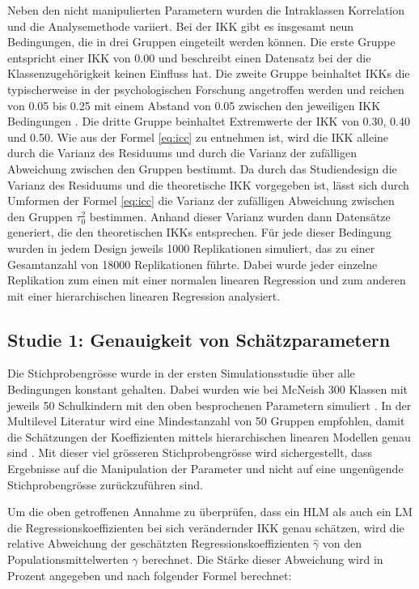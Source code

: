 \documentclass[12pt]{article}\usepackage[]{graphicx}\usepackage[]{color}
\begin{document}
Neben den nicht manipulierten Parametern wurden die Intraklassen Korrelation und die Analysemethode variiert. Bei der IKK gibt es insgesamt neun Bedingungen, die in drei Gruppen eingeteilt werden können. Die erste Gruppe entspricht einer IKK von 0.00 und beschreibt einen Datensatz bei der die Klassenzugehörigkeit keinen Einfluss hat. Die zweite Gruppe beinhaltet IKKs die typischerweise in der psychologischen Forschung angetroffen werden und reichen von 0.05 bis 0.25 mit einem Abstand von 0.05 zwischen den jeweiligen IKK Bedingungen \citep{hedges&hedberg:2007, SnijdersTomA.B2012Ma:a}. Die dritte Gruppe beinhaltet Extremwerte der IKK von 0.30, 0.40 und 0.50. Wie aus der Formel \eqref{eq:icc} zu entnehmen ist, wird die IKK alleine durch die Varianz des Residuums und durch die Varianz der zufälligen Abweichung zwischen den Gruppen bestimmt. Da durch das Studiendesign die Varianz des Residuums und die theoretische IKK vorgegeben ist, lässt sich durch Umformen der Formel \eqref{eq:icc} die Varianz der zufälligen Abweichung zwischen den Gruppen $\tau^{2}_{0}$ bestimmen. Anhand dieser Varianz wurden dann Datensätze generiert, die den theoretischen IKKs entsprechen. Für jede dieser Bedingung wurden in jedem Design jeweils 1000 Replikationen simuliert, das zu einer Gesamtanzahl von 18000 Replikationen führte. Dabei wurde jeder einzelne Replikation zum einen mit einer normalen linearen Regression und zum anderen mit einer hierarchischen linearen Regression analysiert. 

\subsection{Studie 1: Genauigkeit von Schätzparametern}
Die Stichprobengrösse wurde in der ersten Simulationsstudie über alle Bedingungen konstant gehalten. Dabei wurden wie bei McNeish 300 Klassen mit jeweils 50 Schulkindern mit den oben besprochenen Parametern simuliert \citeyearpar{mcneish2014analyzing}. In der Multilevel Literatur wird eine Mindestanzahl von 50 Gruppen empfohlen, damit die Schätzungen der Koeffizienten mittels hierarchischen linearen Modellen genau sind \citep{maashox2005samplesize}. Mit dieser viel grösseren Stichprobengrösse wird sichergestellt, dass Ergebnisse auf die Manipulation der Parameter und nicht auf eine ungenügende Stichprobengrösse zurückzuführen sind.

Um die oben getroffenen Annahme zu überprüfen, dass ein HLM als auch ein LM die Regressionskoeffizienten bei sich verändernder IKK genau schätzen, wird die relative Abweichung der geschätzten Regressionskoeffizienten $\widehat{\gamma}$ von den Populationsmittelwerten $\gamma$ berechnet. Die Stärke dieser Abweichung wird in Prozent angegeben \citep{hooglandboosma1998robustness} und nach folgender Formel berechnet: 
\end{document}
